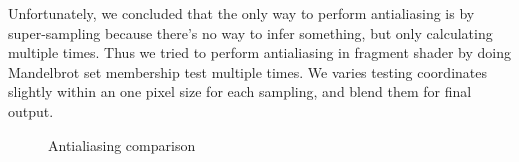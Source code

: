 \documentclass[a4paper]{article}
\begin{document}
Unfortunately, we concluded that the only way to perform antialiasing is by super-sampling because there's no way to infer something, but only calculating multiple times.
Thus we tried to perform antialiasing in fragment shader by doing Mandelbrot set membership test multiple times.
We varies testing coordinates slightly within an one pixel size for each sampling, and blend them for final output.

\begin{figure}[H]
\centering
{}
\caption[1]{Antialiasing comparison}
\end{figure}
\end{document}
